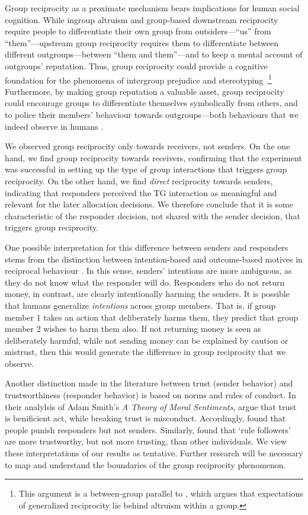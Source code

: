 \documentclass[12pt,a4paper]{article}\usepackage[]{graphicx}\usepackage[]{color}
\begin{document}
Group reciprocity as a proximate mechanism bears implications for human social cognition. While ingroup 
altruism and group-based downstream reciprocity require people to differentiate their own group from 
outsiders---``us'' from ``them''---upstream group reciprocity requires them to differentiate between 
different outgroups---between ``them and them''---and to keep a mental account of outgroups' 
reputation. Thus, group reciprocity could provide a cognitive foundation for the phenomena of 
intergroup prejudice and stereotyping \citep{allport1954nature}.\footnote{This argument is a 
between-group parallel to \citet{yamagishi2000thegroup}, which argues that expectations of 
generalized reciprocity lie behind altruism within a group.} Furthermore, by making group reputation
a valuable asset, group reciprocity could encourage groups to differentiate themselves symbolically
from others, and to police their members' behaviour towards outgroups---both behaviours that we indeed observe in humans \citep{fearon1996explaining}.

We observed group reciprocity only towards receivers, not senders. 
On the one hand, we find group reciprocity towards receivers, confirming that the experiment was successful in setting up the type of group interactions that triggers group reciprocity. On the other hand, we find \emph{direct} reciprocity towards senders, indicating that responders perceived the TG interaction as meaningful and relevant for the later allocation decisions. We therefore conclude that it is some characteristic of the responder decision, not shared with the sender decision, that triggers group reciprocity.

One possible interpretation for this difference between senders and responders stems from the distinction between intention-based and outcome-based motives in reciprocal behaviour \citep{falk2006theory,stanca2009testing}. In this sense, senders' intentions are more ambiguous, as they do not know what the responder will do. Responders who do not return money, in contrast, are clearly intentionally harming the senders.
It is possible that humans generalize \emph{intentions} across group members. That is, if group member 1 takes an action that deliberately harms them, they predict that group member 2 wishes to harm them also. If not returning money is seen as deliberately harmful, while
not sending money can be explained by caution or mistrust, then this would generate the difference in group reciprocity that we observe. 

Another distinction made in the literature between trust (sender behavior) and trustworthiness (responder behavior) is based on norms and rules of conduct. In their analylsis of Adam Smith's \emph{A Theory of Moral Sentiments}, \citet{wilson2017sentiments} argue that trust is benificient act, while breaking trust is misconduct. Accordingly, \citet{wilson2017sentiments} found that people punish responders but not senders. Similarly, \citet{kimbrough2015norms} found that `rule followers' are more trustworthy, but not more trusting, than other individuals.  
We view these interpretations of our results as tentative. Further research will be necessary to map and understand the boundaries of the group reciprocity phenomenon.
\end{document}
